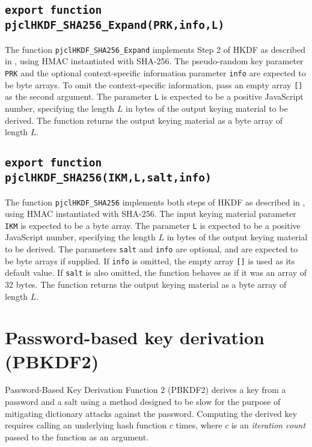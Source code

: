 \documentclass[12pt]{article}
\begin{document}
\subsection{\tt export function pjclHKDF\_SHA256\_Expand(PRK,info,L)}

The function {\tt pjclHKDF\_SHA256\_Expand} implements Step 2 of HKDF as described in 
\cite{RFC5869}, using HMAC instantiated with SHA-256.  The pseudo-random
key parameter {\tt PRK} and the optional context-specific information parameter {\tt info} 
are expected to be byte arrays.  To omit the context-specific information, pass an empty array
{\tt []} as the second argument.  The parameter {\tt L} is expected to be
a positive JavaScript number, specifying the length $L$ in bytes of the output keying material 
to be derived.  The function returns the output keying material as a byte array of length $L$.

\subsection{\tt export function pjclHKDF\_SHA256(IKM,L,salt,info)}

The function {\tt pjclHKDF\_SHA256} implements both steps of HKDF as described in 
\cite{RFC5869}, using HMAC instantiated with SHA-256.  The 
input keying material parameter {\tt IKM} is expected to be a byte array.  The
parameter {\tt L} is expected to be a positive JavaScript number, specifying the 
length $L$ in bytes of the output keying material to be derived.  The parameters 
{\tt salt} and {\tt info} are optional, and are expected to be byte arrays if supplied.
If {\tt info} is omitted, the empty array {\tt []} is used as its default value. 
If {\tt salt} is also omitted, the function behaves as if it was an array of 32 bytes.
The function returns the output keying material as a byte array of length $L$.

\section{Password-based key derivation (PBKDF2)}

Password-Based Key Derivation Function 2 (PBKDF2) derives a key
from a password and a salt using a method designed to be
slow for the purpose of mitigating dictionary attacks against the password.
Computing the derived key requires calling an underlying hash function $c$ times, where 
$c$ is an {\em iteration count\/} passed to the function as an argument.
\end{document}

